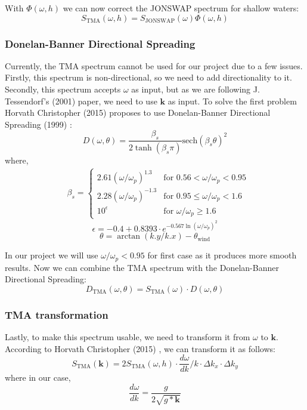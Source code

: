 With $\Phi(\omega, h)$ we can now correct the JONSWAP spectrum for shallow waters:
\begin{equation}
    S_{\text{TMA}}(\omega, h) = S_{\text{JONSWAP}}(\omega) \Phi(\omega, h)
    \label{eq:tma_spectrum}
\end{equation}

\subsubsection{Donelan-Banner Directional Spreading}
Currently, the TMA spectrum cannot be used for our project due to a few issues. Firstly, this spectrum is non-directional, so we need to add directionality to it. Secondly, this spectrum accepts $\omega$ as input, but as we are following J. Tessendorf's (2001) \cite{tessendorf2001} paper, we need to use $\mathbf{k}$ as input.
To solve the first problem Horvath Christopher (2015) \cite{horvath2015} proposes to use Donelan-Banner Directional Spreading (1999) \cite{young1999}:
\begin{equation}
    D(\omega, \theta) = \frac{\beta_s}{2 \tanh(\beta_s\pi)}\text{sech}(\beta_s\theta)^{2}
\end{equation}
where,
$$
\begin{aligned}
    &\beta_s =
    \begin{cases} 
    2.61(\omega/\omega_p)^{1.3} & \text{for } 0.56 < \omega/\omega_p < 0.95 \\
    2.28(\omega/\omega_p)^{-1.3} & \text{for } 0.95 \leq \omega/\omega_p < 1.6 \\
    10^{\epsilon} & \text{for } \omega/\omega_p \geq 1.6
    \end{cases}
\end{aligned}
$$
$$
\epsilon = -0.4 + 0.8393 \cdot e^{-0.567\ln(\omega/\omega_p)^{2}}
$$
$$
\theta = \arctan(k.y / k.x) - \theta_{\text{wind}}
$$

In our project we will use $\omega/\omega_p < 0.95$ for first case as it produces more smooth results.
Now we can combine the TMA spectrum with the Donelan-Banner Directional Spreading:
\begin{equation}
    D_{\text{TMA}}(\omega, \theta) = S_{\text{TMA}}(\omega) \cdot D(\omega, \theta)
\end{equation}

\subsubsection{TMA transformation}
Lastly, to make this spectrum usable, we need to transform it from $\omega$ to $\mathbf{k}$. According to Horvath Christopher (2015) \cite{horvath2015}, we can transform it as follows:
\begin{equation}
    S_{\text{TMA}}(\mathbf{k}) = 2S_{\text{TMA}}(\omega, h) \cdot \frac{d\omega}{dk} / k \cdot \Delta k_x \cdot \Delta k_y
    \label{eq:tma_spectrum_k}
\end{equation}
where in our case,
$$
\frac{d\omega}{dk} = \frac{g}{2\sqrt{g*\mathbf{k}}}
$$

